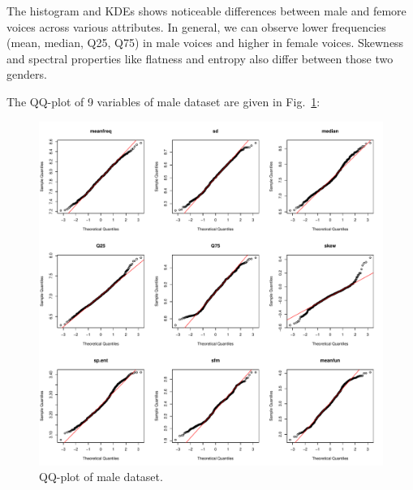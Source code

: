 \documentclass{article}
\begin{document}
	The histogram and KDEs shows noticeable differences between male and femore voices across various attributes. In general, we can observe lower frequencies (mean, median, Q25, Q75) in male voices and higher in female voices. Skewness and spectral properties like flatness and entropy also differ between those two genders. 
	
	The QQ-plot of 9 variables of male dataset are given in Fig.~\ref{qq_male}:
	\begin{figure}
		\centering
		\includegraphics[width=\textwidth]{graphs/gender/qq_plot_male.pdf}
		\caption{QQ-plot of male dataset.}
		\label{qq_male}
	\end{figure}
	
\end{document}
